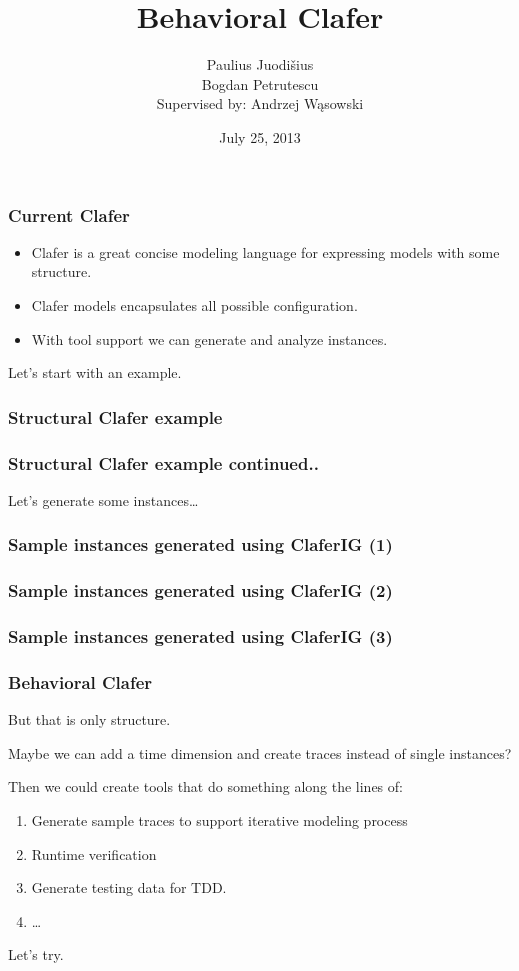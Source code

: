 \documentclass[xcolor=dvipsnames,mathserif,12pt,backend=biber]{beamer}
\title[Discussion ]{Behavioral Clafer}
\author[Paulius Juodi\v{s}ius]{Paulius Juodi\v{s}ius\\ Bogdan Petrutescu\\ {\small Supervised by: Andrzej W\k{a}sowski}}
\date{July 25, 2013}
\begin{document}
  \begin{frame}
    \titlepage
  \end{frame}

  \begin{frame}
    \frametitle{Current Clafer}
    \begin{itemize}
      \item Clafer is a great concise modeling language for expressing models with some structure. 
      \item Clafer models encapsulates all possible configuration.
      \item With tool support we can generate and analyze instances.
    \end{itemize} 
    Let's start with an example.
  \end{frame}

  \begin{frame}
    \frametitle{Structural Clafer example}
    
  \end{frame}

  \begin{frame}
    \frametitle{Structural Clafer example continued..}
    
    Let's generate some instances\dots
  \end{frame}

  \begin{frame}
    \frametitle{Sample instances generated using ClaferIG (1)}
    
  \end{frame} 

  \begin{frame}
    \frametitle{Sample instances generated using ClaferIG (2)}
    
  \end{frame} 

  \begin{frame}
    \frametitle{Sample instances generated using ClaferIG (3)}
    
  \end{frame} 

  \begin{frame}
    \frametitle{Behavioral Clafer}
    But that is only structure. 

    Maybe we can add a time dimension and create traces instead of single instances?

    Then we could create tools that do something along the lines of:
    \begin{enumerate}
      \item Generate sample traces to support iterative modeling process
      \item Runtime verification
      \item Generate testing data for TDD.
      \item \dots
    \end{enumerate} 

    Let's try.
  \end{frame}
\end{document}
